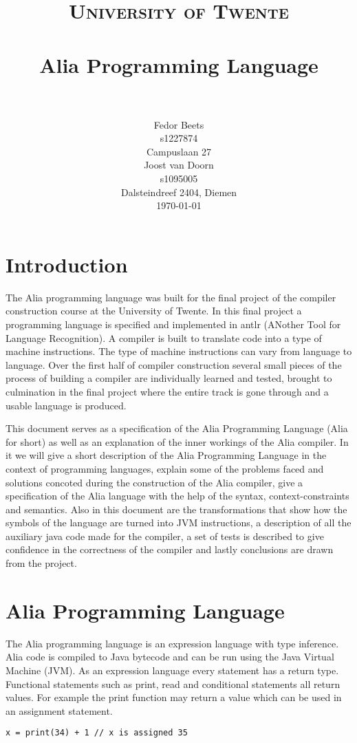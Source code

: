 \documentclass[paper=a4, fontsize=11pt]{article}
\title{
		\usefont{OT1}{bch}{b}{n}
		\normalfont \normalsize \textsc{University of Twente} \\ [25pt]
		\horrule{0.5pt} \\[0.4cm]
		\huge Alia Programming Language \\
		\horrule{2pt} \\[0.5cm]
}
\author{
		\normalfont 								\normalsize
        Fedor Beets\\[-3pt]						\small
        s1227874\\[-3pt]        				\small
        Campuslaan 27\\[8pt]					\normalsize
        Joost van Doorn\\[-3pt]					\small
        s1095005\\[-3pt]						\small
        Dalsteindreef 2404, Diemen\\[8pt]			\normalsize
        \today
}
\date{}
\numberwithin{equation}{section}		%
\numberwithin{figure}{section}			%
\numberwithin{table}{section}				%
\begin{document}
\maketitle
\newpage
\section*{Introduction}
The Alia programming language was built for the final project of the compiler construction course at the University of Twente. In this final project a programming language is specified and implemented in antlr (ANother Tool for Language Recognition). A compiler is built to translate code into a type of machine instructions. The type of machine instructions can vary from language to language. Over the first half of compiler construction several small pieces of the process of building a compiler are individually learned and tested, brought to culmination in the final project where the entire track is gone through and a usable language is produced. 

This document serves as a specification of the Alia Programming Language (Alia for short) as well as an explanation of the inner workings of the Alia compiler. In it we will give a short description of the Alia Programming Language in the context of programming languages, explain some of the problems faced and solutions concoted during the construction of the Alia compiler,  give a specification of the Alia language with the help of the syntax, context-constraints and semantics. Also in this document are the transformations that show how the symbols of the language are turned into JVM instructions, a description of all the auxiliary java code made for the compiler, a set of tests is described to give confidence in the correctness of the compiler and lastly conclusions are drawn from the project.

\section{Alia Programming Language}
The Alia programming language is an expression language with type inference. Alia code is compiled to Java bytecode and can be run using the Java Virtual Machine (JVM). As an expression language every statement has a return type. Functional statements such as print, read and conditional statements all return values. For example the print function may return a value which can be used in an assignment statement.

\begin{lstlisting}
x = print(34) + 1 // x is assigned 35
\end{lstlisting}
\end{document}
